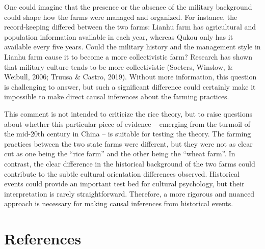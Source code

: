 \documentclass[
  man]{apa6}
\begin{document}
One could imagine that the presence or the absence of the military background could shape how the farms were managed and organized. For instance, the record-keeping differed between the two farms: Lianhu farm has agricultural and population information available in each year, whereas Qukou only has it available every five years. Could the military history and the management style in Lianhu farm cause it to become a more collectivistic farm? Research has shown that military culture tends to be more collectivistic (Soeters, Winslow, \& Weibull, 2006; Truusa \& Castro, 2019). Without more information, this question is challenging to answer, but such a significant difference could certainly make it impossible to make direct causal inferences about the farming practices.

This comment is not intended to criticize the rice theory, but to raise questions about whether this particular piece of evidence -- emerging from the turmoil of the mid-20th century in China -- is suitable for testing the theory. The farming practices between the two state farms were different, but they were not as clear cut as one being the ``rice farm'' and the other being the ``wheat farm''. In contrast, the clear difference in the historical background of the two farms could contribute to the subtle cultural orientation differences observed. Historical events could provide an important test bed for cultural psychology, but their interpretation is rarely straightforward. Therefore, a more rigorous and nuanced approach is necessary for making causal inferences from historical events.

\newpage

\hypertarget{references}{%
\section{References}\label{references}}
\end{document}
